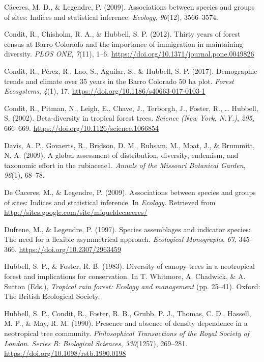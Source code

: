 \documentclass[11pt,]{article}
\begin{document}
\hypertarget{ref-caceres2009associations}{}
Cáceres, M. D., \& Legendre, P. (2009). Associations between species and
groups of sites: Indices and statistical inference. \emph{Ecology},
\emph{90}(12), 3566--3574.

\hypertarget{ref-condit_et_al_2012}{}
Condit, R., Chisholm, R. A., \& Hubbell, S. P. (2012). Thirty years of
forest census at Barro Colorado and the importance of immigration in
maintaining diversity. \emph{PLOS ONE}, \emph{7}(11), 1--6.
\url{https://doi.org/10.1371/journal.pone.0049826}

\hypertarget{ref-condit_et_al_2017}{}
Condit, R., Pérez, R., Lao, S., Aguilar, S., \& Hubbell, S. P. (2017).
Demographic trends and climate over 35 years in the Barro Colorado 50 ha
plot. \emph{Forest Ecosystems}, \emph{4}(1), 17.
\url{https://doi.org/10.1186/s40663-017-0103-1}

\hypertarget{ref-article_condit}{}
Condit, R., Pitman, N., Leigh, E., Chave, J., Terborgh, J., Foster, R.,
\ldots{} Hubbell, S. (2002). Beta-diversity in tropical forest trees.
\emph{Science (New York, N.Y.)}, \emph{295}, 666--669.
\url{https://doi.org/10.1126/science.1066854}

\hypertarget{ref-davis2009global}{}
Davis, A. P., Govaerts, R., Bridson, D. M., Ruhsam, M., Moat, J., \&
Brummitt, N. A. (2009). A global assessment of distribution, diversity,
endemism, and taxonomic effort in the rubiaceae1. \emph{Annals of the
Missouri Botanical Garden}, \emph{96}(1), 68--78.

\hypertarget{ref-cita_indicspecies}{}
De Caceres, M., \& Legendre, P. (2009). Associations between species and
groups of sites: Indices and statistical inference. In \emph{Ecology}.
Retrieved from \url{http://sites.google.com/site/miqueldecaceres/}

\hypertarget{ref-dufrene_legendre}{}
Dufrene, M., \& Legendre, P. (1997). Species assemblages and indicator
species: The need for a flexible asymmetrical approach. \emph{Ecological
Monographs}, \emph{67}, 345--366. \url{https://doi.org/10.2307/2963459}

\hypertarget{ref-hubell_foster_1983}{}
Hubbell, S. P., \& Foster, R. B. (1983). Diversity of canopy trees in a
neotropical forest and implications for conservation. In T. Whitmore, A.
Chadwick, \& A. Sutton (Eds.), \emph{Tropical rain forest: Ecology and
management} (pp. 25--41). Oxford: The British Ecological Society.

\hypertarget{ref-hubell_et_all_1990}{}
Hubbell, S. P., Condit, R., Foster, R. B., Grubb, P. J., Thomas, C. D.,
Hassell, M. P., \& May, R. M. (1990). Presence and absence of density
dependence in a neotropical tree community. \emph{Philosophical
Transactions of the Royal Society of London. Series B: Biological
Sciences}, \emph{330}(1257), 269--281.
\url{https://doi.org/10.1098/rstb.1990.0198}
\end{document}

